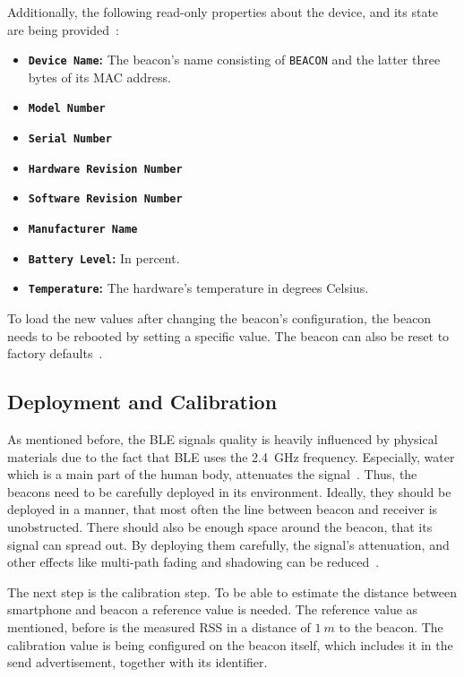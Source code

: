  Additionally, the following read-only properties about the device, and its state are being provided~\citep{binside:ds}:
\begin{itemize}
  \item \textbf{\texttt{Device Name}:} The beacon's name consisting of \texttt{BEACON} and the latter three bytes of its \acs{MAC} address.
  \item \textbf{\texttt{Model Number}}
  \item \textbf{\texttt{Serial Number}}
  \item \textbf{\texttt{Hardware Revision Number}}
  \item \textbf{\texttt{Software Revision Number}}
  \item \textbf{\texttt{Manufacturer Name}}
  \item \textbf{\texttt{Battery Level}:} In percent.
  \item \textbf{\texttt{Temperature}:} The hardware's temperature in degrees Celsius.
\end{itemize}

To load the new values after changing the beacon's configuration, the beacon needs to be rebooted by setting a specific value. The beacon can also be reset to factory defaults~\citep{binside:ds}.

\subsection{Deployment and Calibration}
As mentioned before, the \ac{BLE} signals quality is heavily influenced by physical materials due to the fact that \ac{BLE} uses the 2.4~GHz frequency. Especially, water which is a main part of the human body, attenuates the signal~\citep{apple:getting_started}. Thus, the beacons need to be carefully deployed in its environment. Ideally, they should be deployed in a manner, that most often the line between beacon and receiver is unobstructed. There should also be enough space around the beacon, that its signal can spread out. By deploying them carefully, the signal's attenuation, and other effects like multi-path fading and shadowing can be reduced~\citep{apple:getting_started,IEEE:survey_wireless_indoor_pos}.

The next step is the calibration step. To be able to estimate the distance between smartphone and beacon a reference value is needed. The reference value as mentioned, before is the measured \ac{RSS} in a distance of $1~m$ to the beacon. The calibration value is being configured on the beacon itself, which includes it in the send advertisement, together with its identifier.

